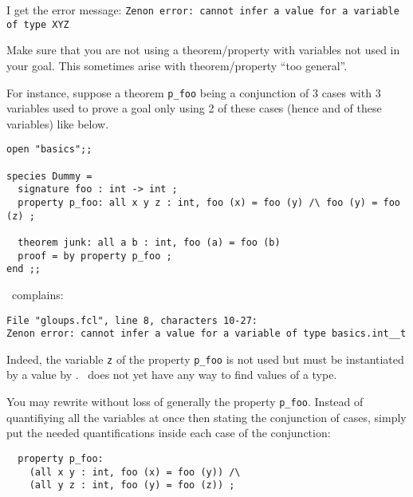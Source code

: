 \documentclass[10pt,a4paper]{article}
\begin{document}
\bigskip
\begin{faqitem}
I get the error message:
\verb+Zenon error: cannot infer a value for a variable of type XYZ+

\medskip
{}
Make sure that you are not using a theorem/property with variables not
used in your goal. This sometimes arise with theorem/property
``too general''.

For instance, suppose a theorem \lstinline"p_foo" being a conjunction of 3
cases with 3 variables used to prove a goal only using 2 of these cases
(hence and of these variables) like below.

{\small
\begin{lstlisting}
open "basics";;

species Dummy =
  signature foo : int -> int ;
  property p_foo: all x y z : int, foo (x) = foo (y) /\ foo (y) = foo (z) ;

  theorem junk: all a b : int, foo (a) = foo (b)
  proof = by property p_foo ;
end ;;
\end{lstlisting}}

\zenon\ complains:
\begin{verbatim}
File "gloups.fcl", line 8, characters 10-27:
Zenon error: cannot infer a value for a variable of type basics.int__t
\end{verbatim}
Indeed, the variable \lstinline"z" of the property \lstinline"p_foo" is not
used but must be instantiated by a value by \zenon. \zenon\ does not yet have
any way to find values of a type.

You may rewrite without loss of generally the property \lstinline"p_foo".
Instead of quantifiying all the variables at once then stating the
conjunction of cases, simply put the needed quantifications inside each
case of the conjunction:

{\small
\begin{lstlisting}
  property p_foo:
    (all x y : int, foo (x) = foo (y)) /\
    (all y z : int, foo (y) = foo (z)) ;
\end{lstlisting}}
\end{faqitem}
\end{document}

